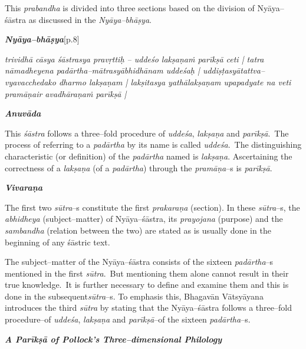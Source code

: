This \textit{prabandha} is divided into three sections based on the division of Nyāya–śāstra as discussed in the \textit{Nyāya–bhāṣya}.

\textit{\textbf{Nyāya–bhāṣya}}[p.8]

\begin{myquote}
\textit{trividhā cāsya śāstrasya pravṛttiḥ – uddeśo lakṣaṇaṁ parīkṣā ceti | tatra nāmadheyena padārtha–mātrasyābhidhānam uddeśaḥ | uddiṣṭasyātattva–vyavacchedako dharmo lakṣaṇam | lakṣitasya yathālakṣaṇam upapadyate na veti pramāṇair avadhāraṇaṁ parīkṣā |}
\end{myquote}

\textit{\textbf{Anuvāda}}

This \textit{śāstra} follows a three–fold procedure of \textit{uddeśa}, \textit{lakṣaṇa} and \textit{parīkṣā}.~The process of referring to a \textit{padārtha} by its name is called \textit{uddeśa}.~The distinguishing characteristic (or definition) of the \textit{padārtha} named is\textit{ lakṣaṇa}. Ascertaining the correctness of a \textit{lakṣaṇa} (of a \textit{padārtha}) through the \textit{pramāṇa}–s is \textit{parīkṣā}.

\textit{\textbf{Vivaraṇa}}

The first two \textit{sūtra}–s constitute the first \textit{prakaraṇa} (section). In these \textit{sūtra}–s, the \textit{abhidheya} (subject–matter) of Nyāya–śāstra, its \textit{prayojana} (purpose) and the \textit{sambandha} (relation between the two) are stated as is usually done in the beginning of any śāstric text.

The subject–matter of the Nyāya–śāstra consists of the sixteen \textit{padārtha}–s mentioned in the first \textit{sūtra}.~But mentioning them alone cannot result in their true knowledge.~It is further necessary to define and examine them and this is done in the subsequent\break \textit{sūtra}–s. To emphasis this, Bhagavān Vātsyāyana introduces the third \textit{sūtra} by stating that the Nyāya–śāstra follows a three–fold procedure–of \textit{uddeśa}, \textit{lakṣaṇa} and \textit{parīkṣā}–of the sixteen \textit{padārtha}–s.

\textbf{\textit{A Parīkṣā of Pollock’s Three–dimensional Philology}}

